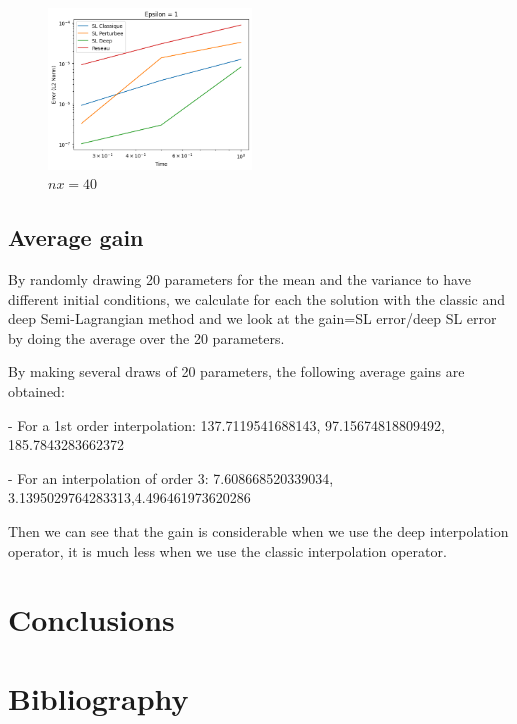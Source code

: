 \documentclass{article}
\begin{document}
\begin{figure}[!h]
    \includegraphics[width=0.48\textwidth]{images/ep25.png}
    \caption{$nx = 40$}
\end{figure}


\newlength{\customspace}
\setlength{\customspace}{2em}
\hspace{\customspace} 
\newpage

\subsection{Average gain}

By randomly drawing 20 parameters for the mean and the variance to have different initial conditions, we calculate for each the solution with the classic and deep Semi-Lagrangian method and we look at the gain=SL error/deep SL error by doing the average over the 20 parameters.\newline 

By making several draws of 20 parameters, the following average gains are obtained:

- For a 1st order interpolation: 137.7119541688143, 97.15674818809492, 185.7843283662372

- For an interpolation of order 3: 7.608668520339034, 3.1395029764283313,4.496461973620286

Then we can see that the gain is considerable when we use the deep interpolation operator, it is much less when we use the classic interpolation operator.\\



\section{Conclusions}


\section{Bibliography}
\end{document}
